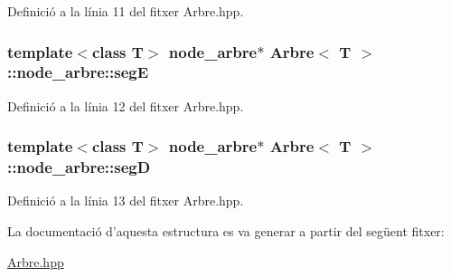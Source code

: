 Definició a la línia 11 del fitxer Arbre.\-hpp.

\hypertarget{struct_arbre_1_1node__arbre_add2e7f2ee789db9f38a3bf2d2dd36972}{
\subsubsection[{seg\-E}]{\setlength{\rightskip}{0pt plus 5cm}template$<$class T$>$ {\bf node\-\_\-arbre}$\ast$ {\bf Arbre}$<$ T $>$\-::node\-\_\-arbre\-::seg\-E}}\label{struct_arbre_1_1node__arbre_add2e7f2ee789db9f38a3bf2d2dd36972}


Definició a la línia 12 del fitxer Arbre.\-hpp.

\hypertarget{struct_arbre_1_1node__arbre_a9986e206810ba9e519b5b6e590238093}{
\subsubsection[{seg\-D}]{\setlength{\rightskip}{0pt plus 5cm}template$<$class T$>$ {\bf node\-\_\-arbre}$\ast$ {\bf Arbre}$<$ T $>$\-::node\-\_\-arbre\-::seg\-D}}\label{struct_arbre_1_1node__arbre_a9986e206810ba9e519b5b6e590238093}


Definició a la línia 13 del fitxer Arbre.\-hpp.



La documentació d'aquesta estructura es va generar a partir del següent fitxer\-:\begin{DoxyCompactItemize}
\item 
\hyperlink{_arbre_8hpp}{Arbre.\-hpp}\end{DoxyCompactItemize}
